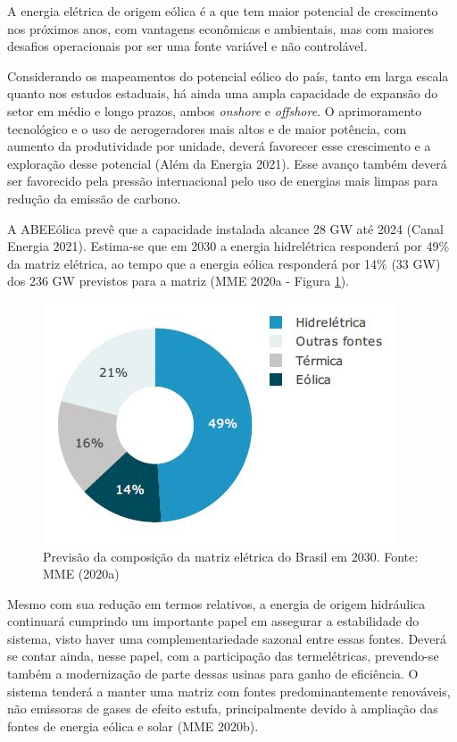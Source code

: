 \documentclass[
  oneside]{scrbook}
\begin{document}
A energia elétrica de origem eólica é a que tem maior potencial de crescimento nos próximos anos, com vantagens econômicas e ambientais, mas com maiores desafios operacionais por ser uma fonte variável e não controlável.

Considerando os mapeamentos do potencial eólico do país, tanto em larga escala quanto nos estudos estaduais, há ainda uma ampla capacidade de expansão do setor em médio e longo prazos, ambos \emph{onshore} e \emph{offshore}. O aprimoramento tecnológico e o uso de aerogeradores mais altos e de maior potência, com aumento da produtividade por unidade, deverá favorecer esse crescimento e a exploração desse potencial (Além da Energia 2021). Esse avanço também deverá ser favorecido pela pressão internacional pelo uso de energias mais limpas para redução da emissão de carbono.

A ABEEólica prevê que a capacidade instalada alcance 28 GW até 2024 (Canal Energia 2021). Estima-se que em 2030 a energia hidrelétrica responderá por 49\% da matriz elétrica, ao tempo que a energia eólica responderá por 14\% (33 GW) dos 236 GW previstos para a matriz (MME 2020a - Figura \ref{fig:08}).

\begin{figure}[H]

{\centering \includegraphics[width=0.6\linewidth]{imagens/cap01/Figura_1.8} 

}

\caption{Previsão da composição da matriz elétrica do Brasil em 2030. Fonte: MME (2020a)}\label{fig:08}
\end{figure}

Mesmo com sua redução em termos relativos, a energia de origem hidráulica continuará cumprindo um importante papel em assegurar a estabilidade do sistema, visto haver uma complementariedade sazonal entre essas fontes. Deverá se contar ainda, nesse papel, com a participação das termelétricas, prevendo-se também a modernização de parte dessas usinas para ganho de eficiência. O sistema tenderá a manter uma matriz com fontes predominantemente renováveis, não emissoras de gases de efeito estufa, principalmente devido à ampliação das fontes de energia eólica e solar (MME 2020b).
\end{document}
